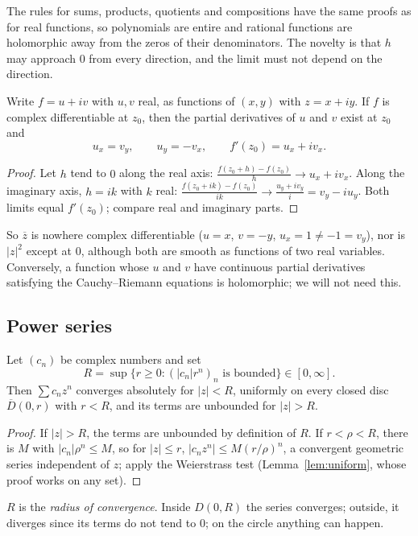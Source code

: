The rules for sums, products, quotients and compositions have the same proofs as for real functions, so polynomials are
entire and rational functions are holomorphic away from the zeros of their denominators. The novelty is that $h$ may approach
$0$ from every direction, and the limit must not depend on the direction.

\begin{proposition}\label{prop:cr}
Write $f=u+iv$ with $u,v$ real, as functions of $(x,y)$ with $z=x+iy$. If $f$ is complex differentiable at $z_0$, then the partial
derivatives of $u$ and $v$ exist at $z_0$ and
\[
u_x=v_y,\qquad u_y=-v_x,\qquad f'(z_0)=u_x+iv_x.
\]
\end{proposition}
\begin{proof}
Let $h$ tend to $0$ along the real axis: $\frac{f(z_0+h)-f(z_0)}h\to u_x+iv_x$. Along the imaginary axis, $h=ik$ with $k$ real:
$\frac{f(z_0+ik)-f(z_0)}{ik}\to\frac{u_y+iv_y}i=v_y-iu_y$. Both limits equal $f'(z_0)$; compare real and imaginary parts.
\end{proof}

So $\overline z$ is nowhere complex differentiable ($u=x$, $v=-y$, $u_x=1\ne-1=v_y$), nor is $|z|^2$ except at $0$, although both are
smooth as functions of two real variables. Conversely, a function whose $u$ and $v$ have continuous partial derivatives
satisfying the Cauchy--Riemann equations is holomorphic; we will not need this.

\subsection*{Power series}

\begin{lemma}[Abel]\label{lem:abel}
Let $(c_n)$ be complex numbers and set
\[
R=\sup\{r\ge0:(|c_n|r^n)_n\text{ is bounded}\}\in[0,\infty].
\]
Then $\sum c_nz^n$ converges
absolutely for $|z|<R$, uniformly on every closed disc $\overline D(0,r)$ with $r<R$, and its terms are unbounded for $|z|>R$.
\end{lemma}
\begin{proof}
If $|z|>R$, the terms are unbounded by definition of $R$. If $r<\rho<R$, there is $M$ with $|c_n|\rho^n\le M$, so for $|z|\le r$,
$|c_nz^n|\le M(r/\rho)^n$, a convergent geometric series independent of $z$; apply the Weierstrass test (Lemma~\ref{lem:uniform}, whose
proof works on any set).
\end{proof}

$R$ is the \emph{radius of convergence}. Inside $D(0,R)$ the series converges; outside, it diverges since its terms do not
tend to $0$; on the circle anything can happen.

